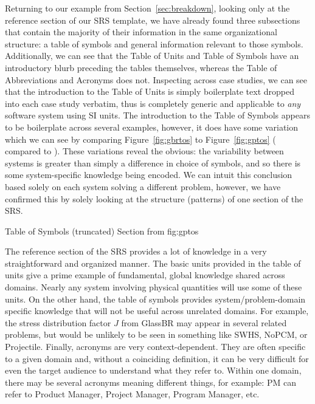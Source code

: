Returning to our example from Section~\ref{sec:breakdown}, looking only at the 
reference section of our SRS template, we have already found
three subsections that contain the majority of their information in the same
organizational structure: a table of symbols and general information relevant 
to those symbols. Additionally, we can see that the Table of Units and Table of 
Symbols have an introductory blurb preceding the tables themselves, whereas the 
Table of Abbreviations and Acronyms does not. Inspecting across case studies, 
we can see that the introduction to the Table of Units is simply boilerplate 
text dropped into each case study verbatim, thus is completely generic and 
applicable to \emph{any} software system using SI units. The introduction to 
the Table of Symbols appears to be boilerplate across several examples, 
however, it does have some variation which we can see by comparing 
Figure~\ref{fig:gbrtos} to Figure~\ref{fig:gptos} (\gb{} compared to \gp{}).
These variations reveal the obvious: the variability between systems is greater 
than simply a difference in choice of symbols, and so there is some 
system-specific knowledge being encoded. We can intuit this conclusion based 
solely on each system solving a different problem, however, we have confirmed 
this by solely looking at the structure (patterns) of one section of the SRS.

{Table of Symbols (truncated) Section from \gp{}}
{fig:gptos}

The reference section of the SRS provides a lot of knowledge in a very 
straightforward and organized manner. The basic units provided in the table of 
units give a prime example of fundamental, global knowledge shared across 
domains. Nearly any system involving physical quantities will use some of these 
units. On the other hand, the table of symbols provides system/problem-domain 
specific knowledge that will not be useful across unrelated domains. For 
example, the stress distribution factor $J$ from GlassBR may appear in several 
related problems, but would be unlikely to be seen in something like SWHS, 
NoPCM, or Projectile. Finally, acronyms are very context-dependent. They are 
often specific to a given domain and, without a coinciding definition, it can 
be very difficult for even the target audience to understand what they refer 
to. Within one domain, there may be several acronyms meaning different things, 
for example: PM can refer to Product Manager, Project Manager, Program 
Manager, etc.

